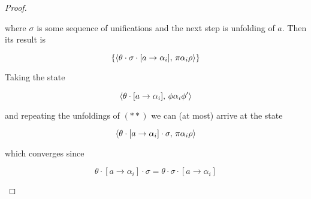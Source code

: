 \begin{proof}
\begin{itemize}
\begin{enumerate}
      where $\sigma$ is some sequence of unifications and the next step is unfolding of $a$. Then its result is
      
      \[
      \{\langle \theta\cdot\sigma\cdot[a\to\alpha_i],\,\pi \alpha_i \rho \rangle\}
      \]
      
      Taking the state
      
      \[
      \langle \theta\cdot[a\to\alpha_i],\,\phi\alpha_i \phi^\prime \rangle
      \]
      
      and repeating the unfoldings of $(**)$ we can (at most) arrive at the state
      
      \[
      \langle \theta\cdot[a\to\alpha_i]\cdot\sigma,\,\pi \alpha_i \rho \rangle
      \]
      
      which converges since
      
      \[
      \theta\cdot[a\to\alpha_i]\cdot\sigma=\theta\cdot\sigma\cdot[a\to\alpha_i]
      \]
    \end{enumerate}
  \end{itemize}
\end{proof}


